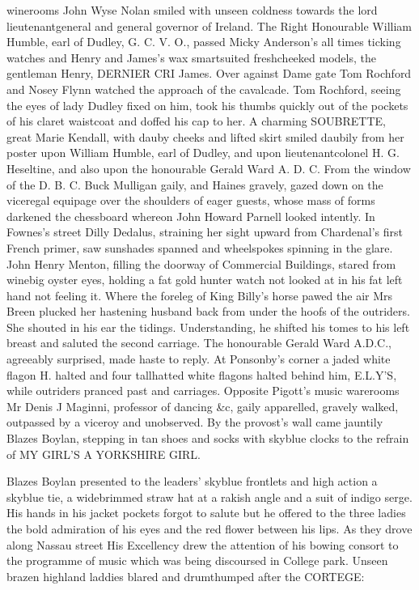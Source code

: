 winerooms John Wyse Nolan smiled with unseen coldness towards the lord
lieutenantgeneral and general governor of Ireland. The Right Honourable
William Humble, earl of Dudley, G. C. V. O., passed Micky Anderson's
all times ticking watches and Henry and James's wax smartsuited
freshcheeked models, the gentleman Henry, DERNIER CRI James. Over against
Dame gate Tom Rochford and Nosey Flynn watched the approach of the
cavalcade. Tom Rochford, seeing the eyes of lady Dudley fixed on him,
took his thumbs quickly out of the pockets of his claret waistcoat and
doffed his cap to her. A charming SOUBRETTE, great Marie Kendall, with
dauby cheeks and lifted skirt smiled daubily from her poster upon William
Humble, earl of Dudley, and upon lieutenantcolonel H. G. Heseltine, and
also upon the honourable Gerald Ward A. D. C. From the window of the
D. B. C. Buck Mulligan gaily, and Haines gravely, gazed down on the
viceregal equipage over the shoulders of eager guests, whose mass of forms
darkened the chessboard whereon John Howard Parnell looked intently. In
Fownes's street Dilly Dedalus, straining her sight upward from
Chardenal's first French primer, saw sunshades spanned and wheelspokes
spinning in the glare. John Henry Menton, filling the doorway of
Commercial Buildings, stared from winebig oyster eyes, holding a fat gold
hunter watch not looked at in his fat left hand not feeling it. Where the
foreleg of King Billy's horse pawed the air Mrs Breen plucked her
hastening husband back from under the hoofs of the outriders. She shouted
in his ear the tidings. Understanding, he shifted his tomes to his left
breast and saluted the second carriage. The honourable Gerald Ward A.D.C.,
agreeably surprised, made haste to reply. At Ponsonby's corner a jaded
white flagon H. halted and four tallhatted white flagons halted behind
him, E.L.Y'S, while outriders pranced past and carriages. Opposite
Pigott's music warerooms Mr Denis J Maginni, professor of dancing \&c,
gaily apparelled, gravely walked, outpassed by a viceroy and unobserved.
By the provost's wall came jauntily Blazes Boylan, stepping in tan shoes
and socks with skyblue clocks to the refrain of MY GIRL'S A YORKSHIRE
GIRL.

Blazes Boylan presented to the leaders' skyblue frontlets and high
action a skyblue tie, a widebrimmed straw hat at a rakish angle and a suit
of indigo serge. His hands in his jacket pockets forgot to salute but he
offered to the three ladies the bold admiration of his eyes and the red
flower between his lips. As they drove along Nassau street His Excellency
drew the attention of his bowing consort to the programme of music which
was being discoursed in College park. Unseen brazen highland laddies
blared and drumthumped after the CORTEGE:


